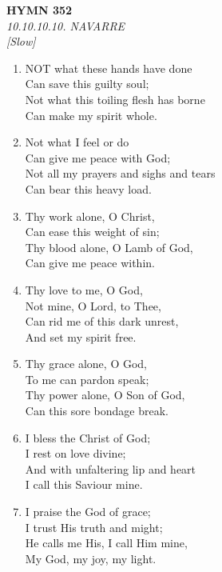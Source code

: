 \documentclass[11pt,a4paper]{article}
\begin{document}
\newpage
\begin{center}
    {\Large \textbf{HYMN 352}}
    \\
    \textit{10.10.10.10. NAVARRE}
    \\
    \textit{\small [Slow]}
\end{center}
\vspace{1em}

\begin{enumerate}
    \item NOT what these hands have done \\
        Can save this guilty soul; \\
        Not what this toiling flesh has borne \\
        Can make my spirit whole.

    \item Not what I feel or do \\
        Can give me peace with God; \\
        Not all my prayers and sighs and tears \\
        Can bear this heavy load.

    \item Thy work alone, O Christ, \\
        Can ease this weight of sin; \\
        Thy blood alone, O Lamb of God, \\
        Can give me peace within.

    \item Thy love to me, O God, \\
        Not mine, O Lord, to Thee, \\
        Can rid me of this dark unrest, \\
        And set my spirit free.

    \item Thy grace alone, O God, \\
        To me can pardon speak; \\
        Thy power alone, O Son of God, \\
        Can this sore bondage break.

    \item I bless the Christ of God; \\
        I rest on love divine; \\
        And with unfaltering lip and heart \\
        I call this Saviour mine.

    \item I praise the God of grace; \\
        I trust His truth and might; \\
        He calls me His, I call Him mine, \\
        My God, my joy, my light.

\end{enumerate}
\end{document}

